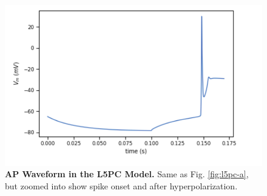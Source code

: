 \begin{figure}
 \begin{center}
\includegraphics[scale=0.8]{figures/spike_shape.png}
\caption[AP Waveform in the L5PC Model (B)]{\textbf{AP Waveform in the L5PC Model.}
Same as Fig. \ref{fig:l5pc-a}, but zoomed into show spike onset and after hyperpolarization.}
\label{fig:l5pc-b}
\end{center}
\end{figure}


